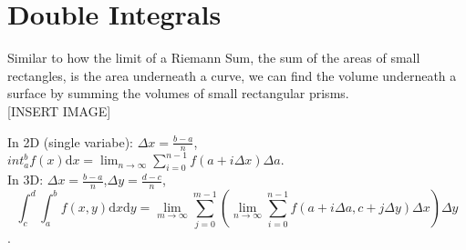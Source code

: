 \section{Double Integrals}
\noindent
Similar to how the limit of a Riemann Sum, the sum of the areas of small rectangles, is the area underneath a curve, we can find the volume underneath a surface by summing the volumes of small rectangular prisms.\\

[INSERT IMAGE]

\noindent
In 2D (single variabe): $\Delta x=\frac{b-a}{n}$, $int_{a}^{b}{f(x)\mathrm{d}x}=\lim_{n\to\infty}{\sum_{i=0}^{n-1}{f(a+i\Delta x)\Delta a}}$.\\
In 3D: $\Delta x=\frac{b-a}{n}$,$\Delta y=\frac{d-c}{n}$,
$$\int_{c}^{d}{\int_{a}^{b}{f(x,y)\mathrm{d}x}\mathrm{d}y}=\lim_{m\to\infty}{\sum_{j=0}^{m-1}{\left(\lim_{n\to\infty}{\sum_{i=0}^{n-1}{f(a+i\Delta a,c+j\Delta y)\Delta x}}\right)\Delta y}}$$.



